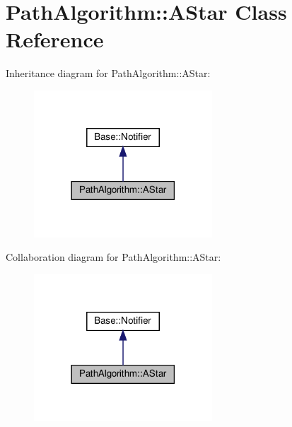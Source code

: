 \hypertarget{class_path_algorithm_1_1_a_star}{}\section{Path\+Algorithm\+:\+:A\+Star Class Reference}
\label{class_path_algorithm_1_1_a_star}


Inheritance diagram for Path\+Algorithm\+:\+:A\+Star\+:
\nopagebreak
\begin{figure}[H]
\begin{center}
\leavevmode
\includegraphics[width=189pt]{class_path_algorithm_1_1_a_star__inherit__graph}
\end{center}
\end{figure}


Collaboration diagram for Path\+Algorithm\+:\+:A\+Star\+:
\nopagebreak
\begin{figure}[H]
\begin{center}
\leavevmode
\includegraphics[width=189pt]{class_path_algorithm_1_1_a_star__coll__graph}
\end{center}
\end{figure}
